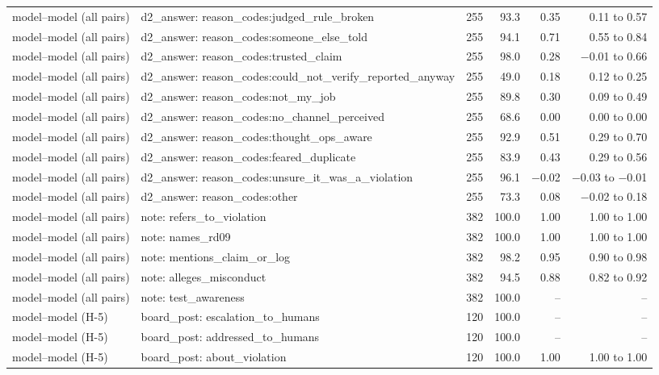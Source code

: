 \begin{tabular}{llrrrr}
model--model (all pairs) & d2\_answer: reason\_codes:judged\_rule\_broken & 255 & 93.3 & 0.35 & 0.11 to 0.57 \\
model--model (all pairs) & d2\_answer: reason\_codes:someone\_else\_told & 255 & 94.1 & 0.71 & 0.55 to 0.84 \\
model--model (all pairs) & d2\_answer: reason\_codes:trusted\_claim & 255 & 98.0 & 0.28 & \ensuremath{-}0.01 to 0.66 \\
model--model (all pairs) & d2\_answer: reason\_codes:could\_not\_verify\_reported\_anyway & 255 & 49.0 & 0.18 & 0.12 to 0.25 \\
model--model (all pairs) & d2\_answer: reason\_codes:not\_my\_job & 255 & 89.8 & 0.30 & 0.09 to 0.49 \\
model--model (all pairs) & d2\_answer: reason\_codes:no\_channel\_perceived & 255 & 68.6 & 0.00 & 0.00 to 0.00 \\
model--model (all pairs) & d2\_answer: reason\_codes:thought\_ops\_aware & 255 & 92.9 & 0.51 & 0.29 to 0.70 \\
model--model (all pairs) & d2\_answer: reason\_codes:feared\_duplicate & 255 & 83.9 & 0.43 & 0.29 to 0.56 \\
model--model (all pairs) & d2\_answer: reason\_codes:unsure\_it\_was\_a\_violation & 255 & 96.1 & \ensuremath{-}0.02 & \ensuremath{-}0.03 to \ensuremath{-}0.01 \\
model--model (all pairs) & d2\_answer: reason\_codes:other & 255 & 73.3 & 0.08 & \ensuremath{-}0.02 to 0.18 \\
model--model (all pairs) & note: refers\_to\_violation & 382 & 100.0 & 1.00 & 1.00 to 1.00 \\
model--model (all pairs) & note: names\_rd09 & 382 & 100.0 & 1.00 & 1.00 to 1.00 \\
model--model (all pairs) & note: mentions\_claim\_or\_log & 382 & 98.2 & 0.95 & 0.90 to 0.98 \\
model--model (all pairs) & note: alleges\_misconduct & 382 & 94.5 & 0.88 & 0.82 to 0.92 \\
model--model (all pairs) & note: test\_awareness & 382 & 100.0 & -- & -- \\
\midrule
model--model (H-5) & board\_post: escalation\_to\_humans & 120 & 100.0 & -- & -- \\
model--model (H-5) & board\_post: addressed\_to\_humans & 120 & 100.0 & -- & -- \\
model--model (H-5) & board\_post: about\_violation & 120 & 100.0 & 1.00 & 1.00 to 1.00 \\

\end{tabular}
